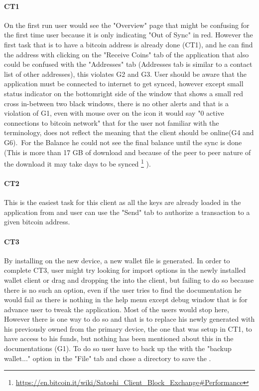  \paragraph{CT1}  On the first run user would see the "Overview" page that might be confusing for the first time user because it is only indicating "Out of Sync" in red. However the first task that is to have a bitcoin address is already done (CT1), and he can find the address with clicking on the "Receive Coins" tab of the application that also could be confused with the "Addresses" tab (Addresses tab is similar to a contact list of other addresses), this violates G2 and G3.
User should be aware that the application must be connected to internet to get synced, however except small status indicator on the bottomright side of the window that shows a small red cross in-between two black windows, there is no other alerts and that is a violation of G1, even with mouse over on the icon it would say "0 active connections to bitcoin network" that for the user not familiar with the terminology, does not reflect the meaning that the client should be online(G4 and G6).\ 
For the Balance he could not see the final balance until the sync is done (This is more than 17 GB of download and because of the peer to peer nature of the download it may take days to be synced \footnote {\url { https://en.bitcoin.it/wiki/Satoshi_Client_Block_Exchange\#Performance}} ).

\paragraph{CT2} This is the easiest task for this client as all the keys are already loaded in the application from \walletfile and user can use the "Send" tab to authorize a transaction to a given bitcoin address.

\paragraph{CT3} By installing \bitcoinclient on the new device, a new wallet file is generated. In order to complete CT3, user might try looking for import options in the newly installed wallet client or drag and dropping the \walletfile into the client, but failing to do so because there is no such an option, even if the user tries to find the documentation he would fail as there is nothing in the help menu except debug window that is for advance user to tweak the application. Most of the users would stop here, However there is one way to do so and that is to replace his newly generated \walletfile with his previously owned \walletfile from the primary device, the one that was setup in CT1, to have access to his funds, but nothing has been mentioned about this in the documentations (G1). To do so user have to back up the \walletfile with the "backup wallet..." option in the "File" tab and chose a directory to save the \walletfile. \

